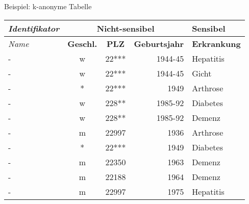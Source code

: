 \begin{frame}{Beispiel: k-anonyme Tabelle}
	\begin{center}
		\begin{tabular}{|l|c|c|r|l|}
		\hline \textit{Identifikator} & \multicolumn{3}{c|}{\textbf{Nicht-sensibel}} & \textbf{Sensibel} \\ 
		\hline \textit{Name} & \textbf{Geschl.} & \textbf{PLZ} & \textbf{Geburtsjahr} & \textbf{Erkrankung} \\ \hline
		\hline \rowcolor{svshellblau1!30} - & w & 22*** & 1944-45 & Hepatitis \\ 
		\hline \rowcolor{svshellblau1!30} - & w & 22*** & 1944-45 & Gicht \\
		\hline \rowcolor{svsgrau1!30} - & * & 22*** & 1949 & Arthrose \\ 
		\hline \rowcolor{svshellblau2!30} - & w & 228** & 1985-92 & Diabetes \\ 
		\hline \rowcolor{svshellblau2!30} - & w & 228** & 1985-92 & Demenz \\  
		\hline - & m & 22997 & 1936 & Arthrose \\ 
		\hline \rowcolor{svsgrau1!30}- & * & 22*** & 1949 & Diabetes \\ 
		\hline - & m & 22350 & 1963 & Demenz \\ 
		\hline - & m & 22188 & 1964 & Demenz \\ 
		\hline - & m & 22997 & 1975 & Hepatitis \\ 
		\hline 
		\end{tabular}
	\end{center}
\end{frame}

